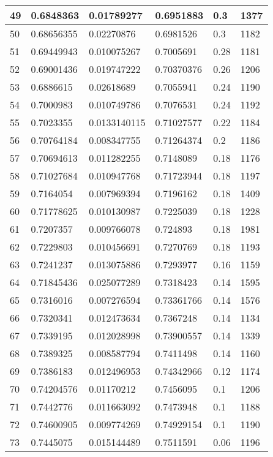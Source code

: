 \begin{longtable}{|l|l|l|l|l|l|}
49 & 0.6848363 & 0.01789277 & 0.6951883 & 0.3 & 1377 \\ \hline 
50 & 0.68656355 & 0.02270876 & 0.6981526 & 0.3 & 1182 \\ \hline 
51 & 0.69449943 & 0.010075267 & 0.7005691 & 0.28 & 1181 \\ \hline 
52 & 0.69001436 & 0.019747222 & 0.70370376 & 0.26 & 1206 \\ \hline 
53 & 0.6886615 & 0.02618689 & 0.7055941 & 0.24 & 1190 \\ \hline 
54 & 0.7000983 & 0.010749786 & 0.7076531 & 0.24 & 1192 \\ \hline 
55 & 0.7023355 & 0.0133140115 & 0.71027577 & 0.22 & 1184 \\ \hline 
56 & 0.70764184 & 0.008347755 & 0.71264374 & 0.2 & 1186 \\ \hline 
57 & 0.70694613 & 0.011282255 & 0.7148089 & 0.18 & 1176 \\ \hline 
58 & 0.71027684 & 0.010947768 & 0.71723944 & 0.18 & 1197 \\ \hline 
59 & 0.7164054 & 0.007969394 & 0.7196162 & 0.18 & 1409 \\ \hline 
60 & 0.71778625 & 0.010130987 & 0.7225039 & 0.18 & 1228 \\ \hline 
61 & 0.7207357 & 0.009766078 & 0.724893 & 0.18 & 1981 \\ \hline 
62 & 0.7229803 & 0.010456691 & 0.7270769 & 0.18 & 1193 \\ \hline 
63 & 0.7241237 & 0.013075886 & 0.7293977 & 0.16 & 1159 \\ \hline 
64 & 0.71845436 & 0.025077289 & 0.7318423 & 0.14 & 1595 \\ \hline 
65 & 0.7316016 & 0.007276594 & 0.73361766 & 0.14 & 1576 \\ \hline 
66 & 0.7320341 & 0.012473634 & 0.7367248 & 0.14 & 1134 \\ \hline 
67 & 0.7339195 & 0.012028998 & 0.73900557 & 0.14 & 1339 \\ \hline 
68 & 0.7389325 & 0.008587794 & 0.7411498 & 0.14 & 1160 \\ \hline 
69 & 0.7386183 & 0.012496953 & 0.74342966 & 0.12 & 1174 \\ \hline 
70 & 0.74204576 & 0.01170212 & 0.7456095 & 0.1 & 1206 \\ \hline 
71 & 0.7442776 & 0.011663092 & 0.7473948 & 0.1 & 1188 \\ \hline 
72 & 0.74600905 & 0.009774269 & 0.74929154 & 0.1 & 1190 \\ \hline 
73 & 0.7445075 & 0.015144489 & 0.7511591 & 0.06 & 1196 \\ \hline 

\end{longtable}
